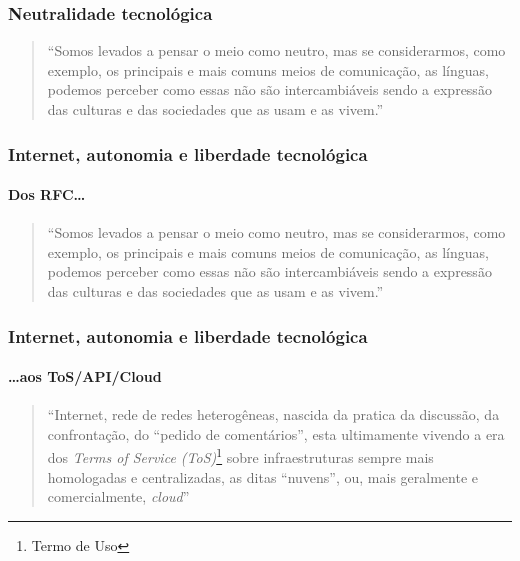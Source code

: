 \documentclass{beamer}
\begin{document}
{ \begin{frame}

   \frametitle{Neutralidade tecnológica}

   \begin{quote}
     ``Somos levados a pensar o meio como neutro, mas se
     considerarmos, como exemplo, os principais e mais comuns meios de
     comunicação, as línguas, podemos perceber como essas não são
     intercambiáveis sendo a expressão das culturas e das sociedades
     que as usam e as vivem.''
   \end{quote}
  
 \end{frame}


\begin{frame}
  \frametitle{Internet, autonomia e liberdade tecnológica}
  \framesubtitle{Dos RFC\ldots}
  \begin{quote}
    ``Somos levados a pensar o meio como neutro, mas se considerarmos,
    como exemplo, os principais e mais comuns meios de comunicação, as
    línguas, podemos perceber como essas não são intercambiáveis sendo
    a expressão das culturas e das sociedades que as usam e as
    vivem.''
  \end{quote}

\end{frame}

 \begin{frame}
   \frametitle{Internet, autonomia e liberdade tecnológica}
  \framesubtitle{\ldots aos ToS/API/Cloud}
   \begin{quote}
     ``Internet, rede de redes heterogêneas, nascida da pratica da
     discussão, da confrontação, do ``pedido de comentários'', esta
     ultimamente vivendo a era dos \emph{Terms of Service
       (ToS)}\footnote{Termo de Uso} sobre infraestruturas sempre mais
     homologadas e centralizadas, as ditas ``nuvens'', ou, mais
     geralmente e comercialmente, \emph{cloud}''
   \end{quote}
 \end{frame}


}
\end{document}
